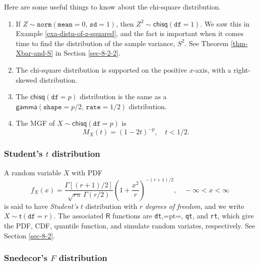 \documentclass[captions=tableheading]{scrbook}
\begin{document}
\begin{rem}
Here are some useful things to know about the chi-square distribution.
\begin{enumerate}
\item If \(Z\sim\mathtt{norm}(\mathtt{mean}=0,\,\mathtt{sd}=1)\), then \(Z^{2}\sim\mathsf{chisq}(\mathtt{df}=1)\). We saw this in Example \ref{exa-distn-of-z-squared}, and the fact is important when it comes time to find the distribution of the sample variance, \(S^{2}\). See Theorem \ref{thm-Xbar-and-S} in Section \ref{sec-8-2-2}.
\item The chi-square distribution is supported on the positive \(x\)-axis, with a right-skewed distribution.
\item The \(\mathsf{chisq}(\mathtt{df}=p)\) distribution is the same as a \(\mathsf{gamma}(\mathtt{shape}=p/2,\,\mathtt{rate}=1/2)\) distribution.
\item The MGF of \(X\sim\mathsf{chisq}(\mathtt{df}=p)\) is
   \begin{equation}
   M_{X}(t)=\left(1-2t\right)^{-p},\quad t < 1/2.\label{eq-mgf-chisq}
   \end{equation}
\end{enumerate}

\end{rem}
\subsubsection{Student's \(t\) distribution}
\label{sec-6-5-2-2}
\label{sub-Student's-t-distribution}


A random variable \(X\) with PDF
\begin{equation}
f_{X}(x) = \frac{\Gamma\left[ (r+1)/2\right] }{\sqrt{r\pi}\,\Gamma(r/2)}\left( 1 + \frac{x^{2}}{r} \right)^{-(r+1)/2},\quad -\infty < x < \infty
\end{equation}
is said to have \emph{Student's} \(t\) distribution with \(r\) \emph{degrees of freedom}, and we write \(X\sim\mathsf{t}(\mathtt{df}=r)\). The associated \(\mathsf{R}\) functions are \texttt{dt},=pt=, \texttt{qt}, and \texttt{rt}, which give the PDF, CDF, quantile function, and simulate random variates, respectively. See Section \ref{sec-8-2}.
\subsubsection{Snedecor's \(F\) distribution}
\label{sec-6-5-2-3}
\label{sub-snedecor-F-distribution}
\end{document}
